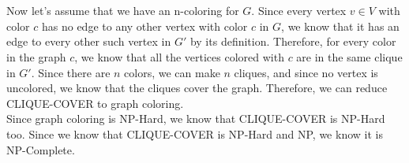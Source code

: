 \documentclass[11pt]{article}
\begin{document}
\begin{solution}
\begin{itemize}
            \\ \\ Now let's assume that we have an n-coloring for $G$. Since every vertex $v \in V$ with color $c$ has no edge to any other vertex with color $c$ in $G$, we know that it has an edge to every other such vertex in $G'$ by its definition. Therefore, for every color in the graph $c$, we know that all the vertices colored with $c$ are in the same clique in $G'$. Since there are $n$ colors, we can make $n$ cliques, and since no vertex is uncolored, we know that the cliques cover the graph. Therefore, we can reduce CLIQUE-COVER to graph coloring.
            \\ Since graph coloring is NP-Hard, we know that CLIQUE-COVER is NP-Hard too. Since we know that CLIQUE-COVER is NP-Hard and NP, we know it is NP-Complete. 
    \end{itemize}
\end{solution}
\end{document}
